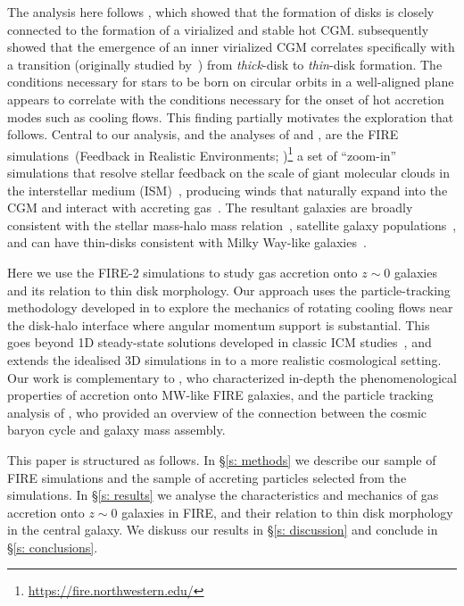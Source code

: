 \documentclass[fleqn,usenatbib]{mnras}
\begin{document}
The analysis here follows \cite{Stern2021}, which showed that the formation of disks is closely connected to the formation of a virialized and stable hot CGM.
\cite{Yu2021} subsequently showed that the emergence of an inner virialized CGM correlates specifically with a transition (originally studied by~\citealt{Ma2017a}) from {\em thick}-disk to {\em thin}-disk formation.
The conditions necessary for stars to be born on circular orbits in a well-aligned plane appears to correlate with the conditions necessary for the onset of hot accretion modes such as cooling flows.
This finding partially motivates the exploration that follows.
Central to our analysis, and the analyses of \citeauthor{Stern2021} and \citeauthor{Yu2021}, are the FIRE simulations~(Feedback in Realistic Environments; \citealt{Hopkins2014, Hopkins2018})\footnote{\url{https://fire.northwestern.edu/}} a set of ``zoom-in'' simulations that resolve stellar feedback on the scale of giant molecular clouds in the interstellar medium (ISM)~\citep{Guszejnov2020b, Benincasa2020}, producing winds that naturally expand into the CGM and interact with accreting gas~\citep{Muratov2015, Muratov2017, Angles-Alcazar2017, Hafen2019, Hafen2020, Pandya2021}.
The resultant galaxies are broadly consistent with the stellar mass-halo mass relation~\citep{Hopkins2017}, satellite galaxy populations~\citep{Wetzel2016, Garrison-Kimmel2019a, Samuel2020}, and can have thin-disks consistent with Milky Way-like galaxies~\citep{Ma2017a, Garrison-Kimmel2018, El-Badry2018, Sanderson2020, Yu2021}.

Here we use the FIRE-2 simulations to study gas accretion onto $z\sim0$ galaxies and its relation to thin disk morphology.
Our approach uses the particle-tracking methodology developed in \citet{Hafen2019, Hafen2020} to explore the mechanics of rotating cooling flows near the disk-halo interface where angular momentum support is substantial.
This goes beyond 1D steady-state solutions developed in classic ICM studies~\citep[e.g.][]{Cowie1980}, and extends the idealised 3D simulations in \cite{Stern2019} to a more realistic cosmological setting. 
Our work is complementary to \citet{Trapp2021}, who characterized in-depth the phenomenological properties of accretion onto MW-like FIRE galaxies, and the particle tracking analysis of \cite{Angles-Alcazar2017}, who provided an overview of the connection between the cosmic baryon cycle and galaxy mass assembly. 

This paper is structured as follows. 
In \S\ref{s: methods} we describe our sample of FIRE simulations and the sample of accreting particles selected from the simulations.
In \S\ref{s: results} we analyse the characteristics and mechanics of gas accretion onto $z\sim0$ galaxies in FIRE, and their relation to thin disk morphology in the central galaxy.
We diskuss our results in \S\ref{s: discussion} and conclude in \S\ref{s: conclusions}.
\end{document}
